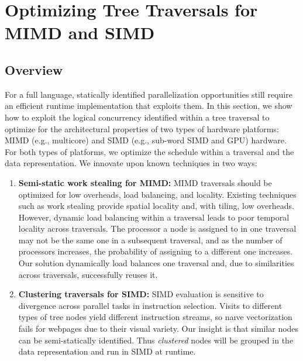 \chapter{Optimizing Tree Traversals for MIMD and SIMD}
\label{chap:6}
\section{Overview}

For a full language, statically identified parallelization opportunities still require an efficient runtime implementation that exploits them. In this section, we show how to exploit the logical concurrency identified within a tree traversal to optimize for the architectural properties of two types of hardware platforms: MIMD (e.g., multicore) and SIMD (e.g., sub-word SIMD and GPU) hardware. For both types of platforms, we optimize the schedule within a traversal and the data representation. We innovate upon known techniques in two ways:

\begin{enumerate}
\item \textbf{Semi-static work stealing for MIMD:} MIMD traversals should be optimized for low overheads, load balancing, and locality. Existing techniques such as work stealing provide spatial locality and, with tiling, low overheads. However, dynamic load balancing within a traversal leads to poor temporal locality across traversals. The processor a node is assigned to in one traversal may not be the same one in a subsequent traversal, and as the number of processors increases, the probability of assigning to a different one increases. Our solution dynamically load balances one traversal and, due to similarities across traversals, successfully reuses it.
\item \textbf{Clustering traversals for SIMD:}  SIMD evaluation is sensitive to divergence across parallel tasks in instruction selection. Visits to different types of tree nodes yield different instruction streams, so na\i{v}e vectorization fails for webpages due to their visual variety. Our insight is that similar nodes can be semi-statically identified. Thus \emph{clustered} nodes will be grouped in the data representation and run in SIMD at runtime.
\end{enumerate}

